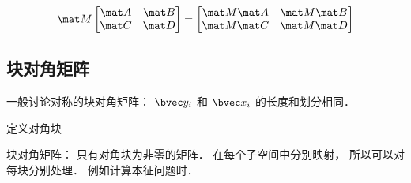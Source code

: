 \begin{equation}
\mat M
\begin{bmatrix}
\mat A & \mat B\\
\mat C & \mat D\\
\end{bmatrix}
=
\begin{bmatrix}
\mat M \mat A & \mat M \mat B\\
\mat M \mat C & \mat M \mat D\\
\end{bmatrix}
\end{equation}


\subsection{块对角矩阵}
一般讨论对称的块对角矩阵： $\bvec y_i$ 和 $\bvec x_i$ 的长度和划分相同．

定义对角块

块对角矩阵： 只有对角块为非零的矩阵． 在每个子空间中分别映射， 所以可以对每块分别处理． 例如计算本征问题时．
